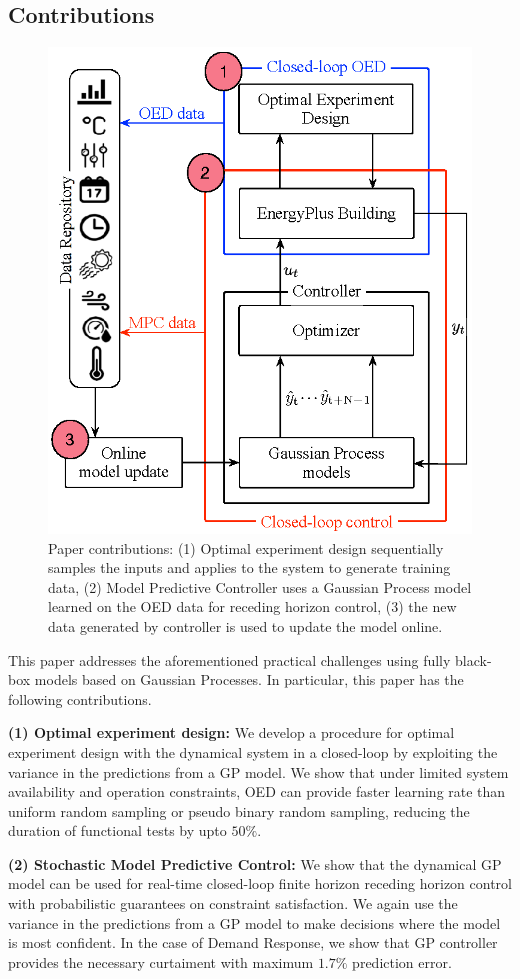 \subsection{Contributions}
\label{SS:contributions}
\begin{figure}[!t]
	\centering
	\includegraphics[width=0.7\linewidth]{figures/overview.eps}
	\caption{Paper contributions: (1) Optimal experiment design sequentially samples the inputs and applies to the system to generate training data, (2) Model Predictive Controller uses a Gaussian Process model learned on the OED data for receding horizon control, (3) the new data generated by controller is used to update the model online.}
	\captionsetup{justification=centering}
    \vspace{-11pt}
	\label{F:intro}
\end{figure}
This paper addresses the aforementioned practical challenges using fully black-box models based on Gaussian Processes.
In particular, this paper has the following contributions.

\noindent \textbf{(1) Optimal experiment design:} We develop a procedure for optimal experiment design with the dynamical system in a closed-loop by exploiting the variance in the predictions from a GP model. We show that under limited system availability and operation constraints, OED can provide faster learning rate than uniform random sampling or pseudo binary random sampling, reducing the duration of functional tests by upto \(50\%\).
	
\noindent \textbf{(2) Stochastic Model Predictive Control:} We show that the dynamical GP model can be used for real-time closed-loop finite horizon receding horizon control with probabilistic guarantees on constraint satisfaction. We again use the variance in the predictions from a GP model to make decisions where the model is most confident. In the case of Demand Response, we show that GP controller provides the necessary curtaiment with maximum \(1.7\% \) prediction error.
	
